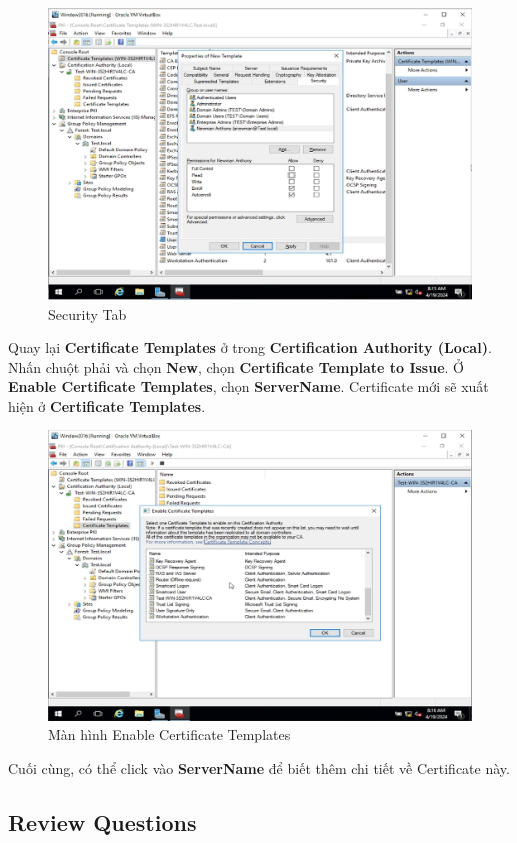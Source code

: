 \begin{figure}[!htb]
    \centering
    \includegraphics[width=0.7\linewidth]{figure//chapter4//lab4_3/security_tab.png}
    \caption{Security Tab}
    \label{fig:enter-label}
\end{figure}

 Quay lại \textbf{Certificate Templates} ở trong \textbf{Certification Authority (Local)}. Nhấn chuột phải và chọn \textbf{New}, chọn \textbf{Certificate Template to Issue}. Ở \textbf{Enable Certificate Templates}, chọn \textbf{ServerName}. Certificate mới sẽ xuất hiện ở \textbf{Certificate Templates}.

\begin{figure}[!htb]
    \centering
    \includegraphics[width=0.7\linewidth]{figure//chapter4//lab4_3/enable_certificate.png}
    \caption{Màn hình Enable Certificate Templates}
    \label{fig:enter-label}
\end{figure}

Cuối cùng, có thể click vào \textbf{ServerName} để biết thêm chi tiết về Certificate này.

\subsection{Review Questions}

